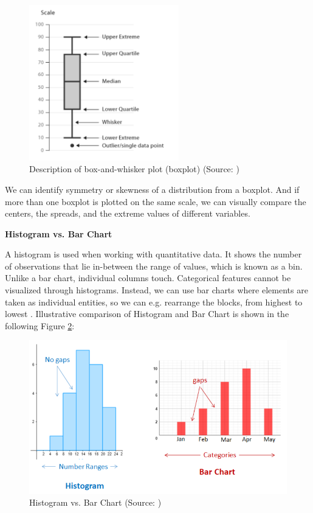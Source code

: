 \documentclass[a4paper,10pt,twoside]{article}
\begin{document}
\vspace{0.3cm}
\begin{figure}[hbt!]
\begin{center}
\includegraphics[width=6.5cm]{../pictures/boxplot.png}
\caption[Description of box-and-whisker plot (boxplot)]{Description of box-and-whisker plot (boxplot) (Source: \cite{heroku})}
\label{fig:boxplot}
\end{center}
\end{figure}

\noindent We can identify symmetry or skewness of a distribution from
a boxplot. And if more than one boxplot is plotted on the same scale,
we can visually compare the centers, the spreads, and the extreme
values of different variables.

\bigskip
\noindent \textbf {Histogram vs. Bar Chart}

\noindent A histogram is used when working with quantitative data. It
shows the number of observations that lie in-between the range of
values, which is known as a bin. Unlike a bar chart, individual
columns touch. Categorical features cannot be visualized through
histograms. Instead, we can use bar charts where elements are taken as
individual entities, so we can e.g. rearrange the blocks, from highest
to lowest \cite{OnlineMathLearning}. Illustrative comparison of
Histogram and Bar Chart is shown in the following Figure
\ref{fig:histogram_barchart}:

\vspace{0.3cm}
\begin{figure}[hbt!]
\begin{center}
\includegraphics[width=12.5cm]{../pictures/histogram_barchart.png}
\caption[Histogram vs. Bar Chart (boxplot)]{Histogram vs. Bar Chart (Source: \cite{OnlineMathLearning})}
\label{fig:histogram_barchart}
\end{center}
\end{figure}
\end{document}
